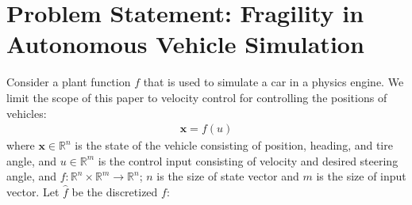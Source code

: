 \documentclass[aps,pra,twocolumn,notitlepage,nofootinbib,superscriptaddress]{revtex4-1}
\newcommand{\spliteq}[1]{\begin{equation}\begin{split}#1\end{split}\end{equation}}
\def\xbf{{\mathbf x}}
\def\Rbb{{\mathbb R}}
\begin{document}
\section{Problem Statement: Fragility in Autonomous Vehicle Simulation}
\label{sec:problem_statement}
%
Consider a plant function $f$ that is used to simulate a car in a physics engine. We limit the scope of this paper to velocity control for controlling the positions of vehicles: 
\spliteq{
\label{eq:carplant}
\xbf = f(u)
}
where $\xbf\in \Rbb^n$ is the state of the vehicle consisting of position, heading, and tire angle, and $u \in \Rbb^m$ is the control input consisting of velocity and desired steering angle, and $f: \Rbb^n \times \Rbb^m \to \Rbb^n$; $n$ is the size of state vector and $m$ is the size of input vector. Let $\hat{f}$ be the discretized $f$:
\end{document}
